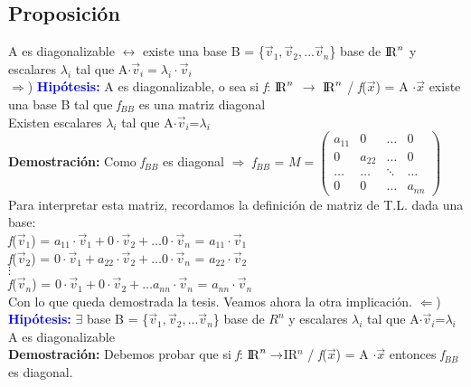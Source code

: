 \documentclass{article}
\begin{document}
\subsection{Proposición}
A es diagonalizable $\leftrightarrow$ existe una base B = \{$\vec{v}_{1}, \vec{v}_2,... \vec{v}_n $\} base de ${\rm I\!R}^{n}$ y escalares $\lambda_{i}$ tal que A$\cdot\vec{v}_{i}=\lambda_{i}\cdot\vec{v}_{i}$\\
$\Rightarrow$) {\bfseries \textcolor{blue}{Hipótesis:}} A es diagonalizable, o sea si \textit{f}: ${\rm I\!R}^{n}$ $\rightarrow$ ${\rm I\!R}^{n}$ / \textit{f}($\vec{x}$) = A $\cdot \vec{x}$ existe una base B tal que \textbardbl \textit{f}\textbardbl $_{BB}$ \indent es una matriz diagonal\\
\indent{\bfseries \textcolor{red}{Tesis:}} Existen escalares $\lambda_{i}$ tal que A$\cdot\vec{v}_{i}$=$\lambda_{i}$ \\
\textbf{Demostración:} Como \textbardbl \textit{f}\textbardbl $_{BB}$ es diagonal $\Rightarrow$ \textbardbl \textit{f}\textbardbl $_{BB}$ = $M = \begin{pmatrix} a_{11}&0&\ldots&0\\ 0&a_{22}&\ldots&0\\ \ldots&\ldots&\ddots&\ldots\\ 0&0&\ldots&a_{nn} \end{pmatrix}$ \\
Para interpretar esta matriz, recordamos la definición de matriz de T.L. dada una base:\\
\textit{f}($\vec{v}_{1}$) = $a_{11}\cdot\vec{v}_1 + 0\cdot\vec{v}_2 + \ldots 0\cdot\vec{v}_{n}$ = $a_{11}\cdot\vec{v}_1$\\
\textit{f}($\vec{v}_{2}$) = $0\cdot\vec{v}_1 + a_{22}\cdot\vec{v}_2 + \ldots 0\cdot\vec{v}_{n}$ = $a_{22}\cdot\vec{v}_2$\\
$\vdots$\\
\textit{f}($\vec{v}_{n}$) = $0\cdot\vec{v}_1 + 0\cdot\vec{v}_2 + \ldots a_{nn}\cdot\vec{v}_{n}$ = $a_{nn}\cdot\vec{v}_n$ \\
Con lo que queda demostrada la tesis. Veamos ahora la otra implicación.
\newpage
$\Leftarrow$) {\bfseries \textcolor{blue}{Hipótesis:}} $\exists$ base B = \{$\vec{v}_{1}, \vec{v}_2,... \vec{v}_n $\} base de $R^{n}$ y escalares $\lambda_{i}$ tal que A$\cdot\vec{v}_{i}$=$\lambda_{i}$\\
\indent \indent {\bfseries \textcolor{red}{Tesis:}} A es diagonalizable \\
\textbf{Demostración:} Debemos probar que si \textit{f}: ${\rm I\!R}^{n}\rightarrow ${\rm I\!R}$^{n}$ / \textit{f}($\vec{x}$) = A $\cdot \vec{x}$ entonces \textbardbl \textit{f}\textbardbl $_{BB}$ es diagonal. \\
\end{document}
